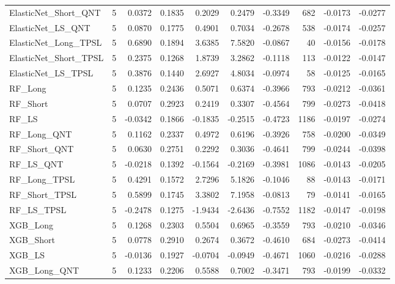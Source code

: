 \begin{tabular}{llrrrrrrrr}
\cline{1-10}
ElasticNet\_Short\_QNT & 5 & 0.0372 & 0.1835 & 0.2029 & 0.2479 & -0.3349 & 682 & -0.0173 & -0.0277 \\
\cline{1-10}
ElasticNet\_LS\_QNT & 5 & 0.0870 & 0.1775 & 0.4901 & 0.7034 & -0.2678 & 538 & -0.0174 & -0.0257 \\
\cline{1-10}
ElasticNet\_Long\_TPSL & 5 & 0.6890 & 0.1894 & 3.6385 & 7.5820 & -0.0867 & 40 & -0.0156 & -0.0178 \\
\cline{1-10}
ElasticNet\_Short\_TPSL & 5 & 0.2375 & 0.1268 & 1.8739 & 3.2862 & -0.1118 & 113 & -0.0122 & -0.0147 \\
\cline{1-10}
ElasticNet\_LS\_TPSL & 5 & 0.3876 & 0.1440 & 2.6927 & 4.8034 & -0.0974 & 58 & -0.0125 & -0.0165 \\
\cline{1-10}
RF\_Long & 5 & 0.1235 & 0.2436 & 0.5071 & 0.6374 & -0.3966 & 793 & -0.0212 & -0.0361 \\
\cline{1-10}
RF\_Short & 5 & 0.0707 & 0.2923 & 0.2419 & 0.3307 & -0.4564 & 799 & -0.0273 & -0.0418 \\
\cline{1-10}
RF\_LS & 5 & -0.0342 & 0.1866 & -0.1835 & -0.2515 & -0.4723 & 1186 & -0.0197 & -0.0274 \\
\cline{1-10}
RF\_Long\_QNT & 5 & 0.1162 & 0.2337 & 0.4972 & 0.6196 & -0.3926 & 758 & -0.0200 & -0.0349 \\
\cline{1-10}
RF\_Short\_QNT & 5 & 0.0630 & 0.2751 & 0.2292 & 0.3036 & -0.4641 & 799 & -0.0244 & -0.0398 \\
\cline{1-10}
RF\_LS\_QNT & 5 & -0.0218 & 0.1392 & -0.1564 & -0.2169 & -0.3981 & 1086 & -0.0143 & -0.0205 \\
\cline{1-10}
RF\_Long\_TPSL & 5 & 0.4291 & 0.1572 & 2.7296 & 5.1826 & -0.1046 & 88 & -0.0143 & -0.0171 \\
\cline{1-10}
RF\_Short\_TPSL & 5 & 0.5899 & 0.1745 & 3.3802 & 7.1958 & -0.0813 & 79 & -0.0141 & -0.0165 \\
\cline{1-10}
RF\_LS\_TPSL & 5 & -0.2478 & 0.1275 & -1.9434 & -2.6436 & -0.7552 & 1182 & -0.0147 & -0.0198 \\
\cline{1-10}
XGB\_Long & 5 & 0.1268 & 0.2303 & 0.5504 & 0.6965 & -0.3559 & 793 & -0.0210 & -0.0346 \\
\cline{1-10}
XGB\_Short & 5 & 0.0778 & 0.2910 & 0.2674 & 0.3672 & -0.4610 & 684 & -0.0273 & -0.0414 \\
\cline{1-10}
XGB\_LS & 5 & -0.0136 & 0.1927 & -0.0704 & -0.0949 & -0.4671 & 1060 & -0.0216 & -0.0288 \\
\cline{1-10}
XGB\_Long\_QNT & 5 & 0.1233 & 0.2206 & 0.5588 & 0.7002 & -0.3471 & 793 & -0.0199 & -0.0332 \\

\end{tabular}
